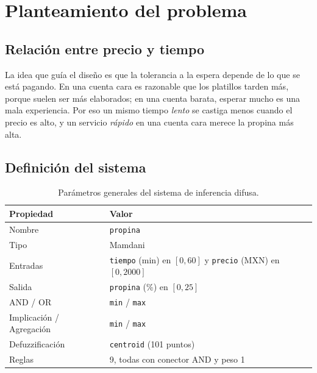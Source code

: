 \documentclass[11pt,letterpaper]{article}
\begin{document}
\section{Planteamiento del problema}

\subsection{Relación entre precio y tiempo}
La idea que guía el diseño es que la tolerancia a la espera depende de lo que se está pagando. En una cuenta cara es razonable que los platillos tarden más, porque suelen ser más elaborados; en una cuenta barata, esperar mucho es una mala experiencia. Por eso un mismo tiempo \emph{lento} se castiga menos cuando el precio es alto, y un servicio \emph{rápido} en una cuenta cara merece la propina más alta.

\subsection{Definición del sistema}

\begin{table}[H]
\centering
\small
\caption{Parámetros generales del sistema de inferencia difusa.}
\label{tab:sistema}
\begin{tabular}{ll}
\toprule
Propiedad & Valor \\
\midrule
Nombre & \texttt{propina} \\
Tipo & Mamdani \\
Entradas & \texttt{tiempo} (min) en $[0, 60]$ y \texttt{precio} (MXN) en $[0, 2000]$ \\
Salida & \texttt{propina} (\%) en $[0, 25]$ \\
AND / OR & \texttt{min} / \texttt{max} \\
Implicación / Agregación & \texttt{min} / \texttt{max} \\
Defuzzificación & \texttt{centroid} (101 puntos) \\
Reglas & 9, todas con conector AND y peso 1 \\
\bottomrule
\end{tabular}
\end{table}
\end{document}
